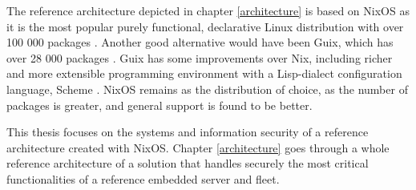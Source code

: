 The reference architecture depicted in chapter \ref{architecture} is based on NixOS as it is the most popular purely functional, declarative Linux distribution with over 100 000 packages \cite{nixosNixOSSearch}. Another good alternative would have been Guix, which has over 28 000 packages \cite{gnuPackagesx2014}. Guix has some improvements over Nix, including richer and more extensible programming environment with a Lisp-dialect configuration language, Scheme \cite{courtes2021deploiements}. NixOS remains as the distribution of choice, as the number of packages is greater, and general support is found to be better.

This thesis focuses on the systems and information security of a reference architecture created with NixOS. Chapter \ref{architecture} goes through a whole reference architecture of a solution that handles securely the most critical functionalities of a reference embedded server and fleet.

